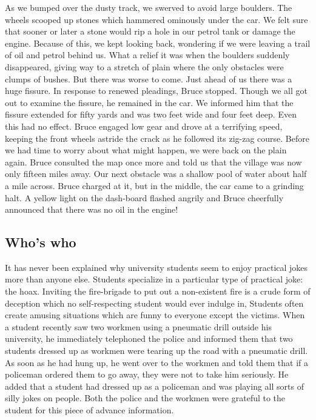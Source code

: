 \documentclass[11pt]{article}
\begin{document}
As we bumped over the dusty track, we swerved to avoid large boulders. The wheels scooped up stones which hammered ominously under the car. We felt sure that sooner or later a stone would rip a hole in our petrol tank or damage the engine. Because of this, we kept looking back, wondering if we were leaving a trail of oil and petrol behind us. What a relief it was when the boulders suddenly disappeared, giving way to a stretch of plain where the only obstacles were clumps of bushes. But there was worse to come. Just ahead of us there was a huge fissure. In response to renewed pleadings, Bruce stopped. Though we all got out to examine the fissure, he remained in the car. We informed him that the fissure extended for fifty yards and was two feet wide and four feet deep. Even this had no effect. Bruce engaged low gear and drove at a terrifying speed, keeping the front wheels astride the crack as he followed its zig-zag course. Before we had time to worry about what might happen, we were back on the plain again. Bruce consulted the map once more and told us that the village was now only fifteen miles away. Our next obstacle was a shallow pool of water about half a mile across. Bruce charged at it, but in the middle, the car came to a grinding halt. A yellow light on the dash-board flashed angrily and Bruce cheerfully announced that there was no oil in the engine!
\subsection{Who's who}
\label{sec-1-40}

It has never been explained why university students seem to enjoy practical jokes more than anyone else. Students specialize in a particular type of practical joke: the hoax. Inviting the fire-brigade to put out a non-existent fire is a crude form of deception which no self-respecting student would ever indulge in, Students often create amusing situations which are funny to everyone except the victims. When a student recently saw two workmen using a pneumatic drill outside his university, he immediately telephoned the police and informed them that two students dressed up as workmen were tearing up the road with a pneumatic drill. As soon as he had hung up, he went over to the workmen and told them that if a policeman ordered them to go away, they were not to take him seriously. He added that a student had dressed up as a policeman and was playing all sorts of silly jokes on people. Both the police and the workmen were grateful to the student for this piece of advance information. 
\end{document}
